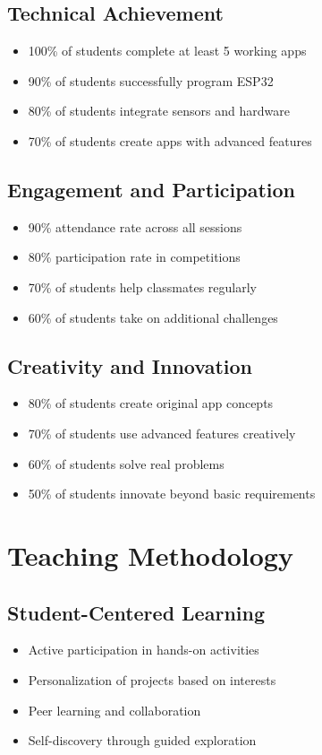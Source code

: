 \documentclass[12pt,a4paper]{article}
\begin{document}
\subsection{Technical Achievement}
\begin{itemize}
    \item 100\% of students complete at least 5 working apps
    \item 90\% of students successfully program ESP32
    \item 80\% of students integrate sensors and hardware
    \item 70\% of students create apps with advanced features
\end{itemize}

\subsection{Engagement and Participation}
\begin{itemize}
    \item 90\% attendance rate across all sessions
    \item 80\% participation rate in competitions
    \item 70\% of students help classmates regularly
    \item 60\% of students take on additional challenges
\end{itemize}

\subsection{Creativity and Innovation}
\begin{itemize}
    \item 80\% of students create original app concepts
    \item 70\% of students use advanced features creatively
    \item 60\% of students solve real problems
    \item 50\% of students innovate beyond basic requirements
\end{itemize}

\section{Teaching Methodology}

\subsection{Student-Centered Learning}
\begin{itemize}
    \item Active participation in hands-on activities
    \item Personalization of projects based on interests
    \item Peer learning and collaboration
    \item Self-discovery through guided exploration
\end{itemize}
\end{document}
